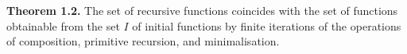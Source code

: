 \textbf{Theorem 1.2.} The set of recursive functions coincides with the set of functions obtainable from the set $I$ of initial functions by finite iterations of the operations of composition, primitive recursion, and minimalisation.
